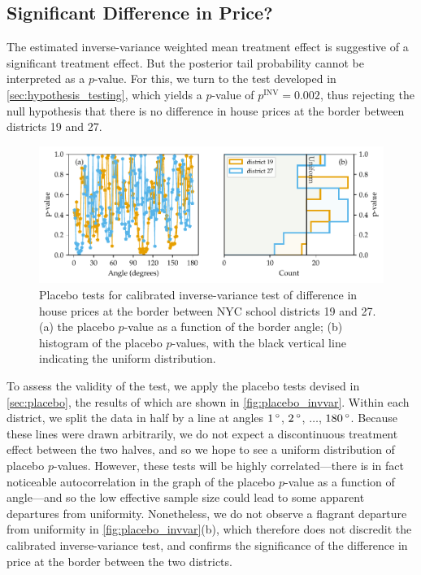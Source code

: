 \subsection{Significant Difference in Price?}
The estimated inverse-variance weighted mean treatment effect is suggestive of a significant treatment effect.
But the posterior tail probability cannot be interpreted as a \(p\)-value.
For this, we turn to the test developed in \autoref{sec:hypothesis_testing}, which yields a \(p\)-value of \(p^{\mathrm{INV}}=0.002\), thus rejecting the null hypothesis that there is no difference in house prices at the border between districts 19 and 27.

\begin{figure}[tb]
    \centering
    \includegraphics[width=\textwidth,height=0.3\textheight,keepaspectratio]{figures/placebo_invvar.pdf}
    \caption{\label{fig:placebo_invvar} Placebo tests for calibrated inverse-variance test of difference in house prices at the border between NYC school districts 19 and 27. 
    (a) the placebo \(p\)-value as a function of the border angle;
    (b) histogram of the placebo \(p\)-values, with the black vertical line indicating the uniform distribution.}
\end{figure}

To assess the validity of the test, we apply the placebo tests devised in \autoref{sec:placebo},
the results of which are shown in \autoref{fig:placebo_invvar}.
Within each district, we split the data in half by a line at angles \(1{\,^\circ}\), \(2{\,^\circ}\), \(\dotsc\), \(180{\,^\circ}\).
Because these lines were drawn arbitrarily, we do not expect a discontinuous treatment effect between the two halves, and so we hope to see a uniform distribution of placebo \(p\)-values.
However, these tests will be highly correlated---there is in fact noticeable autocorrelation in the graph of the placebo \(p\)-value as a function of angle---and so the low effective sample size could lead to some apparent departures from uniformity.
Nonetheless, we do not observe a flagrant departure from uniformity in \autoref{fig:placebo_invvar}(b), which therefore does not discredit the calibrated inverse-variance test, and confirms the significance of the difference in price at the border between the two districts.

